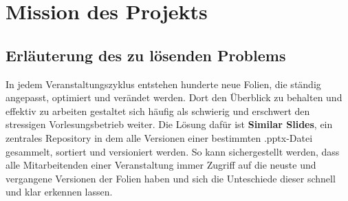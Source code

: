 \section{Mission des Projekts}

\subsection{Erläuterung des zu lösenden Problems}
In jedem Veranstaltungszyklus entstehen hunderte neue Folien,  die ständig angepasst, optimiert und verändet werden. Dort den Überblick zu behalten und effektiv zu arbeiten gestaltet sich häufig als schwierig und erschwert den stressigen Vorlesungsbetrieb weiter.
Die Lösung dafür ist \textbf{Similar Slides}, ein zentrales Repository in dem alle Versionen einer bestimmten .pptx-Datei gesammelt, sortiert und versioniert werden. So kann sichergestellt werden, dass alle Mitarbeitenden einer Veranstaltung immer Zugriff auf die neuste und vergangene Versionen der Folien haben und sich die Unteschiede dieser schnell und klar erkennen lassen.



